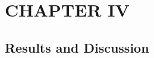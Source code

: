 \documentclass[12pt]{article}
\begin{document}
\section*{CHAPTER IV\centering}
\subsection*{Results and Discussion\centering}
\end{document}
